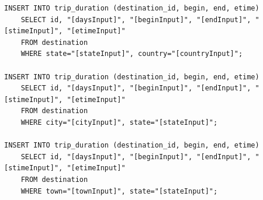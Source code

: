 \documentclass[letterpaper,10pt,onecolumn,compsoc]{IEEEtran}
\begin{document}
\begin{verbatim}
INSERT INTO trip_duration (destination_id, begin, end, etime) 
	SELECT id, "[daysInput]", "[beginInput]", "[endInput]", "[stimeInput]", "[etimeInput]" 
	FROM destination 
	WHERE state="[stateInput]", country="[countryInput]";
	
INSERT INTO trip_duration (destination_id, begin, end, etime) 
	SELECT id, "[daysInput]", "[beginInput]", "[endInput]", "[stimeInput]", "[etimeInput]" 
	FROM destination 
	WHERE city="[cityInput]", state="[stateInput]";
	
INSERT INTO trip_duration (destination_id, begin, end, etime) 
	SELECT id, "[daysInput]", "[beginInput]", "[endInput]", "[stimeInput]", "[etimeInput]" 
	FROM destination 
	WHERE town="[townInput]", state="[stateInput]";
\end{verbatim}

\newpage
\end{document}
